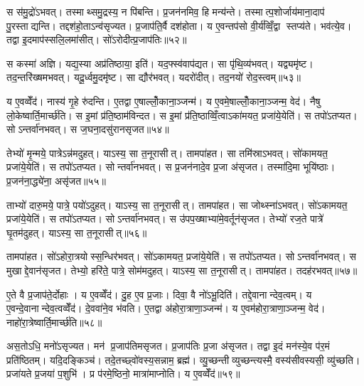 स स॑मु॒द्रो॑ऽभवत्। तस्माथ्समु॒द्रस्य॒ न पि॑बन्ति। प्र॒जन॑नमिव॒ हि मन्य॑न्ते। तस्मात्प॒शोर्जाय॑माना॒दाप॑ पु॒रस्ताद्यन्ति। तद्दश॑हो॒ताऽन्व॑सृज्यत। प्र॒जाप॑ति॒र्वै दश॑होता। य ए॒वन्तप॑सो वी॒र्य॑व्विँ॒द्वा स्तप्य॑ते। भव॑त्ये॒व। तद्वा इ॒दमाप॑स्सलि॒लमा॑सीत्। सो॑ऽरोदीत्प्र॒जाप॑तिः॥५२॥

स कस्मा॑ अज्ञि। यद्य॒स्या अप्र॑तिष्ठाया॒ इति॑। यद॒फ्स्व॑वाप॑द्यत। सा पृ॑थि॒व्य॑भवत्। यद्व्यमृ॑ष्ट। तद॒न्तरि॑ख्षमभवत्। यदू॒र्ध्वमु॒दमृ॑ष्ट। सा द्यौर॑भवत्। यदरो॑दीत्। तद॒नयो॑ रोद॒स्त्वम्॥५३॥

य ए॒वव्वेँद॑। नास्य॑ गृ॒हे रु॑दन्ति। ए॒तद्वा ए॒षाल्लोँ॒काना॒ञ्जन्म॑। य ए॒वमे॒षाल्लोँ॒काना॒ञ्जन्म॒ वेद॑। नैषु लो॒केष्वार्ति॒मार्च्छ॑ति। स इ॒मां प्र॑ति॒ष्ठाम॑विन्दत। स इ॒मां प्र॑ति॒ष्ठाव्विँ॒त्वाऽका॑मयत॒ प्रजा॑ये॒येति॑। स तपो॑ऽतप्यत। सोऽन्तर्वा॑नभवत्। स ज॒घना॒दसु॑रानसृजत॥५४॥

तेभ्यो॑ मृ॒न्मये॒ पात्रेऽन्न॑मदुहत्। याऽस्य॒ सा त॒नूरासीत्। तामपा॑हत। सा तमि॑स्राऽभवत्। सो॑कामयत॒ प्रजा॑ये॒येति॑। स तपो॑ऽतप्यत। सोन्तर्वा॑नभवत्। स प्र॒जन॑नादे॒व प्र॒जा अ॑सृजत। तस्मा॑दि॒मा भूयि॑ष्ठाः। प्र॒जन॑ना॒द्ध्ये॑ना॒ असृ॑जत॥५५॥

ताभ्यो॑ दारु॒मये॒ पात्रे॒ पयो॑ऽदुहत्। याऽस्य॒ सा त॒नूरासीत्। तामपा॑हत। सा जोथ्स्ना॑ऽभवत्। सो॑ऽकामयत॒ प्रजा॑ये॒येति॑। स तपो॑ऽतप्यत। सोऽन्तर्वा॑नभवत्। स उ॑पप॒ख्षाभ्या॑मे॒वर्तून॑सृजत। तेभ्यो॑ रज॒ते पात्रे॑ घृ॒तम॑दुहत्। याऽस्य॒ सा त॒नूरासीत्॥५६॥

तामपा॑हत। सो॑ऽहोरा॒त्रयोस्स॒न्धिर॑भवत्। सो॑ऽकामयत॒ प्रजा॑ये॒येति॑। स तपो॑ऽतप्यत। सोऽन्तर्वा॑नभवत्। स मुखाद्दे॒वान॑सृजत। तेभ्यो॒ हरि॑ते॒ पात्रे॒ सोम॑मदुहत्। याऽस्य॒ सा त॒नूरासीत्। तामपा॑हत। तदह॑रभवत्॥५७॥

ए॒ते वै प्र॒जाप॑ते॒र्दोहाः। य ए॒वव्वेँद॑। दु॒ह ए॒व प्र॒जाः। दिवा॒ वै नो॑ऽभू॒दिति॑। तद्दे॒वानान्देव॒त्वम्। य ए॒वन्दे॒वानान्देव॒त्वव्वेँद॑। दे॒ववा॑ने॒व भ॑वति। ए॒तद्वा अ॑होरा॒त्राणा॒ञ्जन्म॑। य ए॒वम॑होरा॒त्राणा॒ञ्जन्म॒ वेद॑। नाहो॑रा॒त्रेष्वार्ति॒मार्च्छ॑ति॥५८॥

अस॒तोऽधि॒ मनो॑ऽसृज्यत। मन॑ प्र॒जाप॑तिमसृजत। प्र॒जाप॑तिः प्र॒जा अ॑सृजत। तद्वा इ॒दं मन॑स्ये॒व प॑र॒मं प्रति॑ष्ठितम्। यदि॒दङ्किञ्च॑। तदे॒तच्छ्वो॑वस्य॒सन्नाम॒ ब्रह्म॑। व्यु॒च्छन्तीव्युच्छन्त्यस्मै॒ वस्य॑सीवस्यसी॒ व्यु॑च्छति। प्रजा॑यते प्र॒जया॑ प॒शुभि॑। प्र प॑रमे॒ष्ठिनो॒ मात्रा॑माप्नोति। य ए॒वव्वेँद॑॥५९॥

